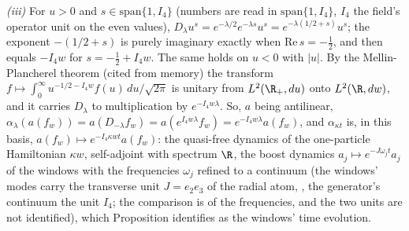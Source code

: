 \emph{(iii)} For $u > 0$ and $s \in \mathrm{span}\{1, I_{4}\}$ (numbers are read in $\mathrm{span}\{1, I_{4}\}$, $I_{4}$ the field's operator unit on the even values), $D_{\lambda}u^{s} = e^{-\lambda/2}e^{-\lambda s}u^{s} = e^{-\lambda(1/2 + s)}u^{s}$; the exponent $-(1/2 + s)$ is purely imaginary exactly when $\mathrm{Re}\,s = -\tfrac12$, and then equals $-I_{4}w$ for $s = -\tfrac12 + I_{4}w$. The same holds on $u < 0$ with $|u|$. By the Mellin-Plancherel theorem (cited from memory) the transform $f \mapsto \int_{0}^{\infty}u^{-1/2 - I_{4}w}f(u)\,du/\sqrt{2\pi}$ is unitary from $L^{2}(\R_{+}, du)$ onto $L^{2}(\R, dw)$, and it carries $D_{\lambda}$ to multiplication by $e^{-I_{4}w\lambda}$. So, $a$ being antilinear, $\alpha_{\lambda}(a(f_{w})) = a(D_{-\lambda}f_{w}) = a(e^{I_{4}w\lambda}f_{w}) = e^{-I_{4}w\lambda}a(f_{w})$, and $\alpha_{\kappa t}$ is, in this basis, $a(f_{w}) \mapsto e^{-I_{4}\kappa wt}a(f_{w})$: the quasi-free dynamics of the one-particle Hamiltonian $\kappa w$, self-adjoint with spectrum $\R$, the boost dynamics $a_{j} \mapsto e^{-J\omega_{j}t}a_{j}$ of the windows with the frequencies $\omega_{j}$ refined to a continuum (the windows' modes carry the transverse unit $J = e_{2}e_{3}$ of the radial atom, , the generator's continuum the unit $I_{4}$; the comparison is of the frequencies, and the two units are not identified), which Proposition  identifies as the windows' time evolution.

